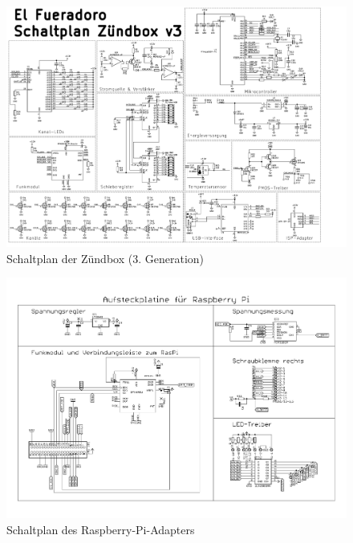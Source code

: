 \documentclass[paper=a4, parskip, numbers=noenddot, toc=listof, headsepline]{scrbook}
\begin{document}
		\begin{figure}
			\centering
			\includegraphics[angle=90,totalheight=.95\textheight,keepaspectratio]{Bilder/Zuendboxschaltplan3}
			\caption{Schaltplan der Zündbox (3. Generation)}
			\label{fig:zuendbox3schematic}
		\end{figure}

		\begin{figure}
			\centering
			\includegraphics[angle=-90,totalheight=.95\textheight,keepaspectratio]{Bilder/Piadapterschaltplan}
			\caption{Schaltplan des Raspberry-Pi-Adapters}
			\label{fig:piadapterschematic}
		\end{figure}
\end{document}
